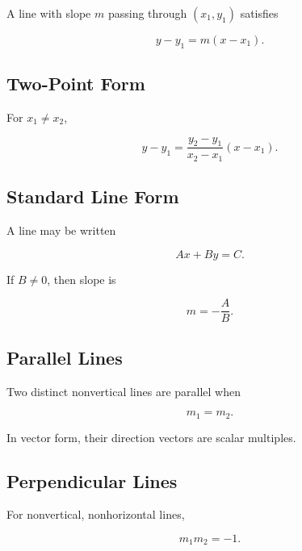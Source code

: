 A line with slope \(m\) passing through \((x_1,y_1)\) satisfies

\[
\boxed{
y-y_1
=
m(x-x_1).
}
\]

\subsection{Two-Point Form}
\label{subsec:two-point-line-reference}

For \(x_1\neq x_2\),

\[
\boxed{
y-y_1
=
\frac{
y_2-y_1
}{
x_2-x_1
}
(x-x_1).
}
\]

\subsection{Standard Line Form}
\label{subsec:standard-line-reference}

A line may be written

\[
\boxed{
Ax+By=C.
}
\]

If \(B\neq0\), then slope is

\[
\boxed{
m
=
-\frac{A}{B}.
}
\]

\subsection{Parallel Lines}
\label{subsec:parallel-lines-reference}

Two distinct nonvertical lines are parallel when

\[
\boxed{
m_1=m_2.
}
\]

In vector form, their direction vectors are scalar multiples.

\subsection{Perpendicular Lines}
\label{subsec:perpendicular-lines-reference}

For nonvertical, nonhorizontal lines,

\[
\boxed{
m_1m_2=-1.
}
\]

